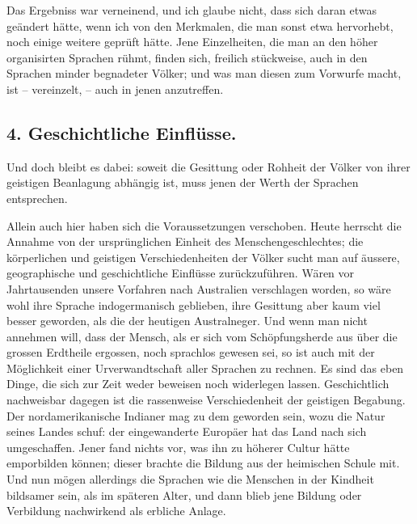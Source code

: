 \largerpage
Das Ergebniss war verneinend, und ich glaube nicht, dass sich daran etwas geändert hätte, wenn ich von den Merkmalen, die man sonst etwa hervorhebt, noch einige weitere geprüft hätte. Jene Einzelheiten, die man an den höher organisirten Sprachen rühmt, finden sich, freilich stückweise, auch in den Sprachen minder begnadeter Völker; und was man diesen zum Vorwurfe macht, ist – vereinzelt, – auch in jenen anzutreffen.

\label{sp.395}

\subsection*{4. Geschichtliche Einflüsse.}\label{IV.IV.4}

Und doch bleibt es dabei: soweit die Gesittung oder Rohheit der Völker von ihrer geistigen Beanlagung abhängig ist, muss jenen der Werth der Sprachen entsprechen.

Allein auch hier haben sich die Voraussetzungen verschoben. Heute herrscht die Annahme von der ursprünglichen Einheit des Menschengeschlechtes; die körperlichen und geistigen Verschiedenheiten der Völker sucht man auf äussere, geographische und geschichtliche Einflüsse zurückzuführen. Wären vor Jahrtausenden unsere Vorfahren nach Australien verschlagen worden, so wäre wohl ihre Sprache indogermanisch geblieben, ihre Gesittung aber kaum viel besser geworden, als die der heutigen Australneger. Und wenn man nicht annehmen will, dass der Mensch, als er sich vom Schöpfungsherde aus über die grossen Erdtheile ergossen, noch sprachlos gewesen sei, so ist auch mit der Möglichkeit einer Urverwandtschaft aller Sprachen zu rechnen. Es sind das eben Dinge, \label{fp.377} die sich zur Zeit weder beweisen noch widerlegen lassen. Geschichtlich nachweisbar dagegen ist die rassenweise Verschiedenheit der geistigen Begabung. Der nordamerikanische Indianer mag zu dem geworden sein, wozu  die Natur seines Landes schuf: der eingewanderte Europäer hat das Land nach sich umgeschaffen. Jener fand nichts vor, was ihn zu höherer Cultur hätte emporbilden können; dieser brachte die Bildung aus der heimischen Schule mit. Und nun mögen allerdings die Sprachen wie die Menschen in der Kindheit bildsamer sein, als im späteren Alter, und dann blieb jene Bildung oder Verbildung nachwirkend als erbliche Anlage.

